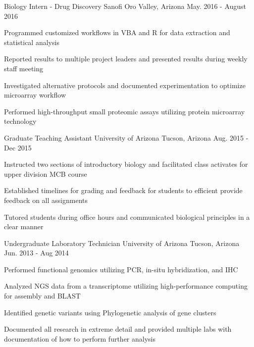 \begin{cventries}
  \cventry
    {Biology Intern - Drug Discovery} %
    {Sanofi} %
    {Oro Valley, Arizona} %
    {May. 2016 - August 2016} %
    {
      \begin{cvitems} %
        \item{Programmed customized workflows in VBA and R for data extraction and statistical analysis}
        \item{Reported results to multiple project leaders and presented results during weekly staff meeting}
        \item{Investigated alternative protocols and documented experimentation to optimize microarray workflow}
        \item{Performed high-throughput small proteomic assays utilizing protein microarray technology}
      \end{cvitems}
    }

  \cventry
    {Graduate Teaching Assistant} %
    {University of Arizona} %
    {Tucson, Arizona} %
    {Aug. 2015 - Dec 2015} %
    {
      \begin{cvitems} %
        \item{Instructed two sections of introductory biology and facilitated class activates for upper division MCB course}
        \item{Established timelines for grading and feedback for students to efficient provide feedback on all assignments}
        \item{Tutored students during office hours and communicated biological principles in a clear manner}
      \end{cvitems}
    }

  \cventry
    {Undergraduate Laboratory Technician} %
    {University of Arizona} %
    {Tucson, Arizona} %
    {Jun. 2013 - Aug 2014} %
    {
      \begin{cvitems} %
        \item{Performed functional genomics utilizing PCR, in-situ hybridization, and IHC}
        \item{Analyzed NGS data from a transcriptome utilizing high-performance computing for assembly and BLAST}
        \item{Identified genetic variants using Phylogenetic analysis of gene clusters}
        \item{Documented all research in extreme detail and provided multiple labs with documentation of how to perform further analysis}
      \end{cvitems}
    }
\end{cventries}
